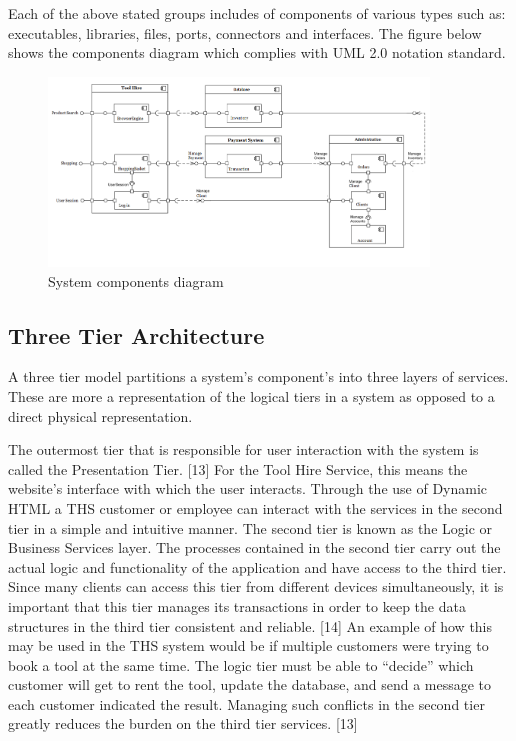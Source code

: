 Each of the above stated groups includes of components of various types
such as: executables, libraries, files, ports, connectors and
interfaces. The figure below shows the components diagram which complies
with UML 2.0 notation standard.

\begin{figure}[H]
      \centering
      \includegraphics[trim = 0 0 0 0, clip, width=0.9\textwidth]{TempImg/compD.png}
      \caption{System components diagram}
\end{figure}

\hypertarget{three-tier-architecture}{%
\subsection{Three Tier Architecture}\label{three-tier-architecture}}

A three tier model partitions a system's component's into three layers
of services. These are more a representation of the logical tiers in a
system as opposed to a direct physical representation.

The outermost tier that is responsible for user interaction with the
system is called the Presentation Tier. {[}13{]} For the Tool Hire
Service, this means the website's interface with which the user
interacts. Through the use of Dynamic HTML a THS customer or employee
can interact with the services in the second tier in a simple and
intuitive manner. The second tier is known as the Logic or Business
Services layer. The processes contained in the second tier carry out the
actual logic and functionality of the application and have access to the
third tier. Since many clients can access this tier from different
devices simultaneously, it is important that this tier manages its
transactions in order to keep the data structures in the third tier
consistent and reliable. {[}14{]} An example of how this may be used in
the THS system would be if multiple customers were trying to book a tool
at the same time. The logic tier must be able to ``decide'' which
customer will get to rent the tool, update the database, and send a
message to each customer indicated the result. Managing such conflicts
in the second tier greatly reduces the burden on the third tier
services. {[}13{]}

